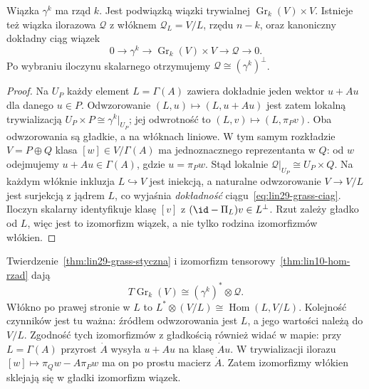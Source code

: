 \begin{stwierdzenie}
\label{prop:lin29-grass-wiazki}
Wiązka $\gamma^k$ ma rząd $k$. Jest podwiązką
wiązki trywialnej $\operatorname{Gr}_k(V)\times V$.
Istnieje też wiązka ilorazowa $\mathcal Q$ z
włóknem $\mathcal Q_L=V/L$, rzędu $n-k$,
oraz kanoniczny dokładny ciąg wiązek
\begin{equation}\label{eq:lin29-grass-ciag}
 0\longrightarrow\gamma^k
 \longrightarrow\operatorname{Gr}_k(V)\times V
 \longrightarrow\mathcal Q\longrightarrow0.
\end{equation}
Po wybraniu iloczynu skalarnego otrzymujemy
$\mathcal Q\cong(\gamma^k)^\perp$.
\end{stwierdzenie}
\begin{proof}
Na $U_P$ każdy element $L=\Gamma(A)$ zawiera
dokładnie jeden wektor $u+Au$ dla danego $u\in P$.
Odwzorowanie $(L,u)\mapsto(L,u+Au)$ jest zatem lokalną
trywializacją $U_P\times P\cong\gamma^k|_{U_P}$;
jej odwrotność to $(L,v)\mapsto(L,\pi_Pv)$.
Oba odwzorowania są gładkie, a na włóknach liniowe.
W tym samym rozkładzie $V=P\oplus Q$ klasa
$[w]\in V/\Gamma(A)$ ma jednoznacznego
reprezentanta w $Q$: od $w$ odejmujemy
$u+Au\in\Gamma(A)$, gdzie $u=\pi_Pw$.
Stąd lokalnie $\mathcal Q|_{U_P}\cong U_P\times Q$.
Na każdym włóknie inkluzja $L\hookrightarrow V$
jest iniekcją, a naturalne odwzorowanie $V\to V/L$ jest
surjekcją z jądrem $L$, co wyjaśnia \emph{dokładność}
ciągu~\eqref{eq:lin29-grass-ciag}. Iloczyn skalarny
identyfikuje klasę $[v]$ z $(\id-\Pi_L)v\in L^\perp$.
Rzut zależy gładko od $L$, więc jest to izomorfizm wiązek,
a nie tylko rodzina izomorfizmów włókien.
\end{proof}

\begin{uwaga}
Twierdzenie~\ref{thm:lin29-grass-styczna} i
izomorfizm tensorowy~\ref{thm:lin10-hom-rzad} dają
\[
 T\operatorname{Gr}_k(V)\cong
       (\gamma^k)^*\otimes\mathcal Q.
\]
Włókno po prawej stronie w $L$ to
$L^*\otimes(V/L)\cong\operatorname{Hom}(L,V/L)$.
Kolejność czynników jest tu ważna: źródłem odwzorowania
jest $L$, a jego wartości należą do $V/L$.
Zgodność tych izomorfizmów z gładkością również widać w mapie:
przy $L=\Gamma(A)$ przyrost $\dot A$ wysyła $u+Au$ na
klasę $\dot A u$. W trywializacji ilorazu
$[w]\mapsto\pi_Qw-A\pi_Pw$ ma on po prostu macierz $\dot A$.
Zatem izomorfizmy włókien sklejają się w gładki izomorfizm wiązek.
\end{uwaga}


